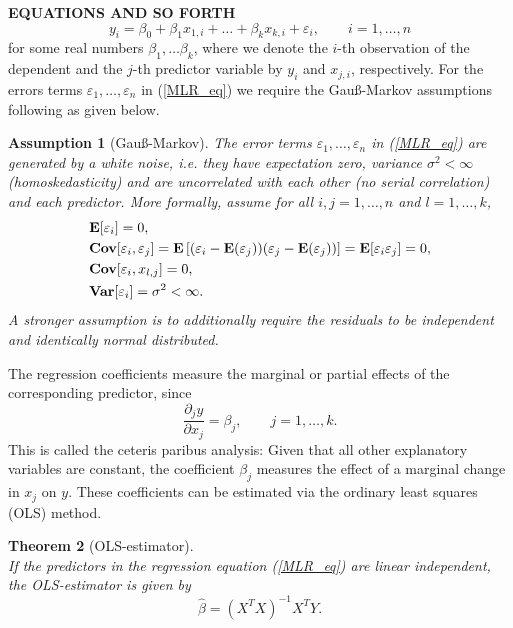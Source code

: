 \documentclass[a4paper, 12pt]{scrreprt}
\newtheorem{Theorem}{Theorem}[chapter]
\newtheorem{Assumption}[Theorem]{Assumption}
\newcommand{\ew}{\mbox{\textbf{E}}}
\newcommand{\var}{\mbox{\textbf{Var}}}
\newcommand{\cov}{\mbox{\textbf{Cov}}}
\begin{document}
\textbf{EQUATIONS AND SO FORTH}
\begin{equation}\label{MLR_eq}
y_i = \beta_0 + \beta_1 x_{1,i} + \ldots + \beta_k x_{k,i} + \varepsilon_i, \qquad i=1,\ldots, n
\end{equation}
for some real numbers $\beta_1, \ldots \beta_k$, where we denote the $i$-th observation of the dependent and the $j$-th predictor variable by $y_i$ and $x_{j,i}$, respectively. 
For the errors terms $\varepsilon_1, \ldots, \varepsilon_n$ in (\ref{MLR_eq}) we require the Gauß-Markov assumptions following \textcite[chapter 1.1.2]{ameniya1985advance} as given below.

\begin{Assumption}[Gauß-Markov] \upshape \label{assumption:gauss}
The error terms $\varepsilon_1, \ldots, \varepsilon_n$ in (\ref{MLR_eq}) are generated by a white noise, i.e. they have expectation zero, variance $\sigma^2 < \infty$ (homoskedasticity) and are uncorrelated with each other (no serial correlation) and each predictor. More formally, assume for all $i,j = 1,\ldots, n$ and $l=1,\ldots,k$,	
	\begin{align}
	& \ew[\varepsilon_i] = 0, \\
	&\cov[\varepsilon_i, \varepsilon_j] = \ew \left[ (\varepsilon_i - \ew(\varepsilon_j)) (\varepsilon_j - \ew(\varepsilon_j)) \right] = \ew[\varepsilon_i \varepsilon_j] = 0, \\
	&\cov[\varepsilon_i, x_{l,j}] = 0, \\
	& \var[\varepsilon_i] = \sigma^2 < \infty.
	\end{align}
A stronger assumption is to additionally require the residuals to be independent and identically normal distributed.
\end{Assumption}

The regression coefficients measure the marginal or partial effects of the corresponding predictor, since
\begin{equation}
\frac{\partial_j y}{\partial x_j} = \beta_j, \qquad j=1,\ldots,k. 
\end{equation}
This is called the ceteris paribus analysis: Given that all other explanatory variables are constant, the coefficient $\beta_j$ measures the effect of a marginal change in $x_j$ on $y$.
These coefficients can be estimated via the ordinary least squares (OLS) method. 

\begin{Theorem}[OLS-estimator] \upshape $\text{ }$ \\
If the predictors in the regression equation (\ref{MLR_eq}) are linear independent, the OLS-estimator is given by 
\begin{equation}\label{OLS}
\hat{\beta} = (X^T X)^{-1} X^T Y.
\end{equation}
\end{Theorem}
\end{document}
